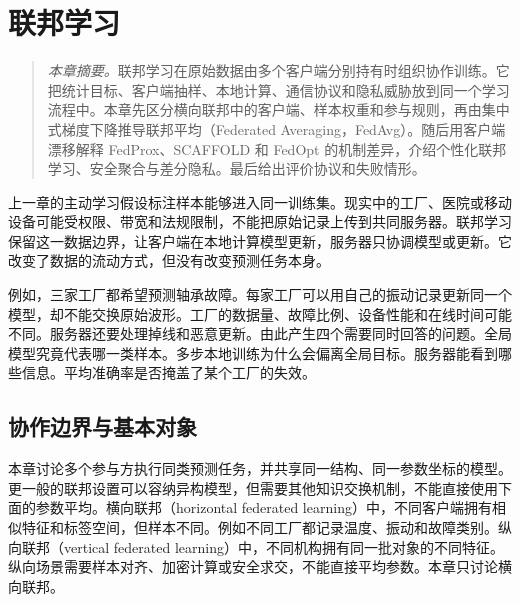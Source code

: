 \chapter{联邦学习}
\label{chap:federated}
\begin{quote}\small
\textit{本章摘要。}联邦学习在原始数据由多个客户端分别持有时组织协作训练。它把统计目标、客户端抽样、本地计算、通信协议和隐私威胁放到同一个学习流程中。本章先区分横向联邦中的客户端、样本权重和参与规则，再由集中式梯度下降推导联邦平均（Federated Averaging，FedAvg）。随后用客户端漂移解释 FedProx、SCAFFOLD 和 FedOpt 的机制差异，介绍个性化联邦学习、安全聚合与差分隐私。最后给出评价协议和失败情形。\end{quote}

上一章的主动学习假设标注样本能够进入同一训练集。现实中的工厂、医院或移动设备可能受权限、带宽和法规限制，不能把原始记录上传到共同服务器。联邦学习保留这一数据边界，让客户端在本地计算模型更新，服务器只协调模型或更新。它改变了数据的流动方式，但没有改变预测任务本身。

例如，三家工厂都希望预测轴承故障。每家工厂可以用自己的振动记录更新同一个模型，却不能交换原始波形。工厂的数据量、故障比例、设备性能和在线时间可能不同。服务器还要处理掉线和恶意更新。由此产生四个需要同时回答的问题。全局模型究竟代表哪一类样本。多步本地训练为什么会偏离全局目标。服务器能看到哪些信息。平均准确率是否掩盖了某个工厂的失效。

\section{协作边界与基本对象}

本章讨论多个参与方执行同类预测任务，并共享同一结构、同一参数坐标的模型。更一般的联邦设置可以容纳异构模型，但需要其他知识交换机制，不能直接使用下面的参数平均。横向联邦（horizontal federated learning）中，不同客户端拥有相似特征和标签空间，但样本不同。例如不同工厂都记录温度、振动和故障类别。纵向联邦（vertical federated learning）中，不同机构拥有同一批对象的不同特征。纵向场景需要样本对齐、加密计算或安全求交，不能直接平均参数。本章只讨论横向联邦。

